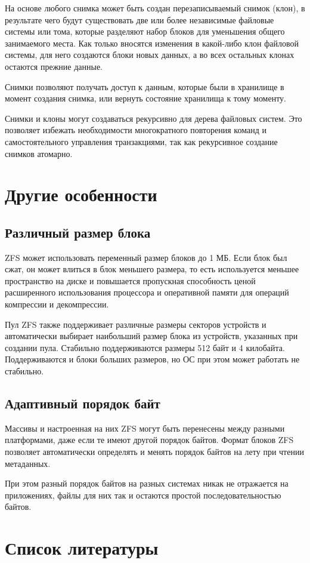 \documentclass[a4page]{article}
\begin{document}
На основе любого снимка может быть создан перезаписываемый снимок (клон),
в результате чего будут существовать две или более независимые файловые системы или тома,
которые разделяют набор блоков для уменьшения общего занимаемого места.
Как только вносятся изменения в какой-либо клон файловой системы,
для него создаются блоки новых данных,
а во всех остальных клонах остаются прежние данные.

Снимки позволяют получать доступ к данным, которые были в хранилище в момент создания снимка,
или вернуть состояние хранилища к тому моменту.

Снимки и клоны могут создаваться рекурсивно для дерева файловых систем.
Это позволяет избежать необходимости многократного повторения команд
и самостоятельного управления транзакциями,
так как рекурсивное создание снимков атомарно.

\section{Другие особенности}

\subsection{Различный размер блока}

ZFS может использовать переменный размер блоков до 1 МБ.
Если блок был сжат, он может влиться в блок меньшего размера,
то есть используется меньшее пространство на диске и повышается пропускная способность
ценой расширенного использования процессора и оперативной памяти для операций компрессии и декомпрессии.

Пул ZFS также поддерживает различные размеры секторов устройств
и автоматически выбирает наибольший размер блока из устройств, указанных при создании пула.
Стабильно поддерживаются размеры 512 байт и 4 килобайта.
Поддерживаются и блоки больших размеров, но ОС при этом может работать не стабильно.

\subsection{Адаптивный порядок байт}

Массивы и настроенная на них ZFS могут быть перенесены между разными платформами,
даже если те имеют другой порядок байтов.
Формат блоков ZFS позволяет автоматически определять и менять порядок байтов на лету при чтении метаданных.

При этом разный порядок байтов на разных системах никак не отражается на приложениях,
файлы для них так и остаются простой последовательностью байтов.

\newpage

\section{Список литературы}

\printbibliography [heading=none]
\end{document}
